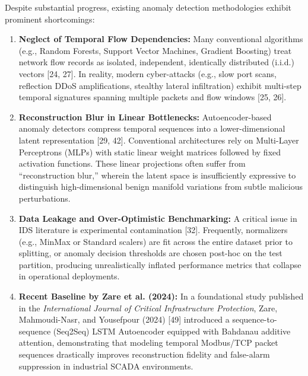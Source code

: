 \documentclass[twocolumn]{article}
\begin{document}
Despite substantial progress, existing anomaly detection methodologies exhibit prominent shortcomings:
\begin{enumerate}
    \item \textbf{Neglect of Temporal Flow Dependencies:} Many conventional algorithms (e.g., Random Forests, Support Vector Machines, Gradient Boosting) treat network flow records as isolated, independent, identically distributed (i.i.d.) vectors [24, 27]. In reality, modern cyber-attacks (e.g., slow port scans, reflection DDoS amplifications, stealthy lateral infiltration) exhibit multi-step temporal signatures spanning multiple packets and flow windows [25, 26].
    \item \textbf{Reconstruction Blur in Linear Bottlenecks:} Autoencoder-based anomaly detectors compress temporal sequences into a lower-dimensional latent representation [29, 42]. Conventional architectures rely on Multi-Layer Perceptrons (MLPs) with static linear weight matrices followed by fixed activation functions. These linear projections often suffer from ``reconstruction blur,'' wherein the latent space is insufficiently expressive to distinguish high-dimensional benign manifold variations from subtle malicious perturbations.
    \item \textbf{Data Leakage and Over-Optimistic Benchmarking:} A critical issue in IDS literature is experimental contamination [32]. Frequently, normalizers (e.g., MinMax or Standard scalers) are fit across the entire dataset prior to splitting, or anomaly decision thresholds are chosen post-hoc on the test partition, producing unrealistically inflated performance metrics that collapse in operational deployments.
    \item \textbf{Recent Baseline by Zare et al. (2024):} In a foundational study published in the \textit{International Journal of Critical Infrastructure Protection}, Zare, Mahmoudi-Nasr, and Yousefpour (2024) [49] introduced a sequence-to-sequence (Seq2Seq) LSTM Autoencoder equipped with Bahdanau additive attention, demonstrating that modeling temporal Modbus/TCP packet sequences drastically improves reconstruction fidelity and false-alarm suppression in industrial SCADA environments.
\end{enumerate}
\end{document}

